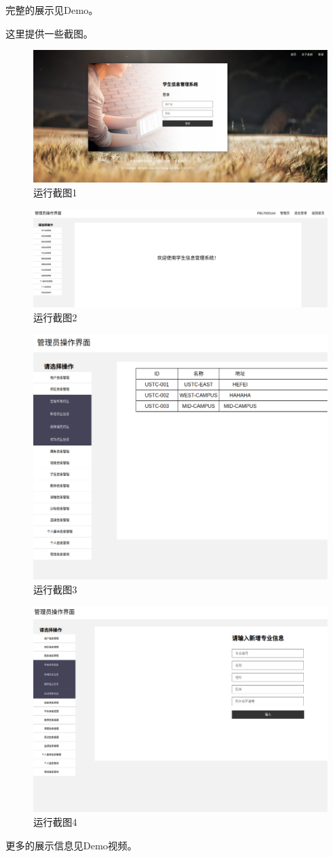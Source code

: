 \documentclass[../report.tex]{subfiles}
\begin{document}
完整的展示见Demo。

这里提供一些截图。
\begin{figure}[H]
\centering
\includegraphics[width=0.7\linewidth]{figure/show1}
\caption{运行截图1}
\label{fig:show1}
\end{figure}
\begin{figure}[H]
\centering
\includegraphics[width=0.7\linewidth]{figure/show2}
\caption{运行截图2}
\label{fig:show2}
\end{figure}
\begin{figure}[H]
\centering
\includegraphics[width=0.7\linewidth]{figure/show3}
\caption{运行截图3}
\label{fig:show3}
\end{figure}
\begin{figure}[H]
\centering
\includegraphics[width=0.7\linewidth]{figure/show4}
\caption{运行截图4}
\label{fig:show4}
\end{figure}

更多的展示信息见Demo视频。
\end{document}
